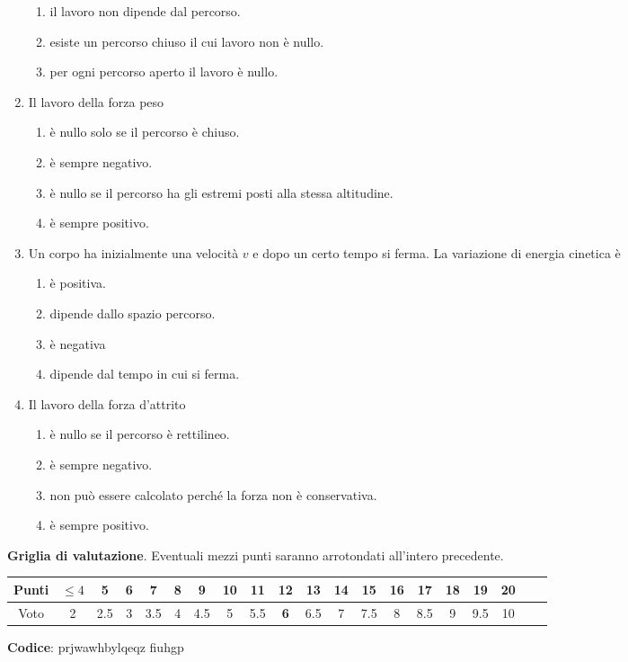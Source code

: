 \documentclass{article}
\begin{document}
\begin{enumerate}
\begin{enumerate}[label=\Alph*.]
    \item il lavoro non dipende dal percorso.
    \item esiste un percorso chiuso il cui lavoro non è nullo.
    \item per ogni percorso aperto il lavoro è nullo.
  \end{enumerate}
  \item Il lavoro della forza peso
  \begin{enumerate}[label=\Alph*.]
    \item è nullo solo se il percorso è chiuso.
    \item è sempre negativo.
    \item è nullo se il percorso ha gli estremi posti alla stessa altitudine.
    \item è sempre positivo.
  \end{enumerate}
  \item Un corpo ha inizialmente una velocità $v$ e dopo un certo tempo si ferma. La variazione di energia cinetica è
  \begin{enumerate}[label=\Alph*.]
    \item è positiva.
    \item dipende dallo spazio percorso.
    \item è negativa
    \item dipende dal tempo in cui si ferma.
  \end{enumerate}
  \item Il lavoro della forza d'attrito
  \begin{enumerate}[label=\Alph*.]
    \item è nullo se il percorso è rettilineo.
    \item è sempre negativo.
    \item non può essere calcolato perché la forza non è conservativa.
    \item è sempre positivo.
  \end{enumerate}
\end{enumerate}








\newpage \maketitle \centering \textbf{Griglia di valutazione}. Eventuali mezzi punti saranno arrotondati all'intero precedente. \begin{table}[h]     \centering \begin{tabular}{|c|c|c|c|c|c|c|c|c|c|c|c|c|c|c|c|c|c|c|c|} \hline Punti &  $\leq 4$ & 5 & 6 & 7 & 8 & 9 & 10 & 11 & \textbf{12} & 13 & 14 & 15 & 16 & 17 & 18 & 19 & 20 \\ \hline Voto & 2 & 2.5 & 3 & 3.5 & 4 & 4.5 & 5 & 5.5 & \textbf{6} & 6.5 & 7 & 7.5 & 8 & 8.5 & 9 & 9.5 & 10 \\ \hline \end{tabular} \end{table}
\textbf{Codice}: prjwawhbylqeqz fiuhgp
\end{document}
